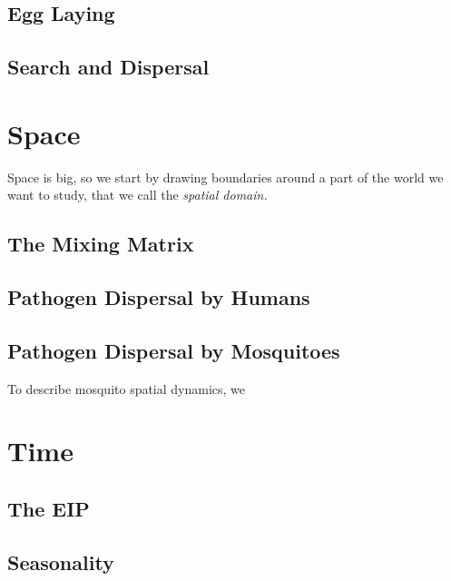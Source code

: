 \documentclass[
]{book}
\begin{document}
\hypertarget{egg-laying}{%
\subsection{Egg Laying}\label{egg-laying}}

\hypertarget{search-and-dispersal}{%
\subsection{Search and Dispersal}\label{search-and-dispersal}}

\hypertarget{space}{%
\section{Space}\label{space}}

Space is big, so we start by drawing boundaries around a part of the world we want to study, that we call the \emph{spatial domain.}

\hypertarget{the-mixing-matrix}{%
\subsection{The Mixing Matrix}\label{the-mixing-matrix}}

\hypertarget{pathogen-dispersal-by-humans}{%
\subsection{Pathogen Dispersal by Humans}\label{pathogen-dispersal-by-humans}}

\hypertarget{pathogen-dispersal-by-mosquitoes}{%
\subsection{Pathogen Dispersal by Mosquitoes}\label{pathogen-dispersal-by-mosquitoes}}

To describe mosquito spatial dynamics, we

\hypertarget{time}{%
\section{Time}\label{time}}

\hypertarget{the-eip}{%
\subsection{The EIP}\label{the-eip}}

\hypertarget{seasonality}{%
\subsection{Seasonality}\label{seasonality}}
\end{document}
